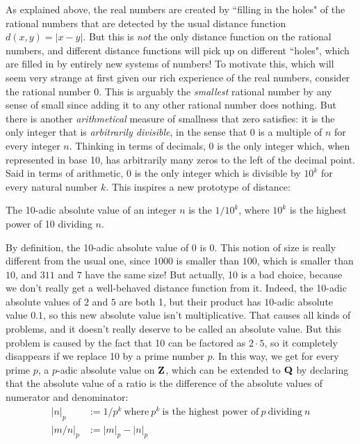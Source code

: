 \documentclass[11pt,oneside]{amsart}
\begin{document}
As explained above, the real numbers are created by ``filling in the holes" of the rational numbers that are detected by the
usual distance function $d(x,y)=|x-y|$.  But this is {\em not} the only distance function on the rational numbers, and
different distance functions will pick up on different ``holes", which are filled in by entirely new systems of numbers!
To motivate this, which will seem very strange at first given our rich experience of the real numbers, consider the rational
number 0.  This is arguably the {\em smallest} rational number by any sense of small since adding it to any other rational number
does nothing.  But there is another {\em arithmetical} measure of smallness that zero satisfies: it is the only integer
that is {\em arbitrarily divisible}, in the sense that $0$ is a multiple of $n$ for every integer $n$.  Thinking in terms of 
decimals, $0$ is the only integer which, when represented in base 10, has arbitrarily many zeros to the left of the decimal point.
Said in terms of arithmetic, 0 is the only integer which is divisible by $10^k$ for every natural number $k$.
This inspires a new prototype of distance:

\begin{definition}
	The 10-adic absolute value of an integer $n$ is the $1/10^k$, where $10^k$ is the highest power of
	10 dividing $n$.
\end{definition}  

By definition, the 10-adic absolute value of $0$ is 0.  This notion of size 
is really different from the usual one, since $1000$ is smaller than $100$, which is smaller than $10$,
and $311$ and $7$ have the same size!  But actually, 10 is a bad choice, because we don't really get a well-behaved
distance function from it.  Indeed, the 10-adic absolute values of $2$ and $5$ are both 1, but their product has 
$10$-adic absolute value $0.1$, so this new absolute value isn't multiplicative.  That causes all kinds of problems,
and it doesn't really deserve to be called an absolute value.  But this problem is caused by the fact that 10 can be factored as $2\cdot 5$,
so it completely disappears if we replace 10 by a prime number $p$.  In this way, we get for every prime $p$,
a $p$-adic absolute value on $\mathbf{Z}$, which can be extended to $\mathbf{Q}$ by declaring that the absolute value of
a ratio is the difference of the absolute values of numerator and denominator:
\begin{align*}
	|n|_p &:= 1/p^k\ \text{where}\ p^k\ \text{is the highest power of}\ p\ \text{dividing}\ n \\
	|m/n|_p &:= |m|_p - |n|_p
\end{align*}
\end{document}
